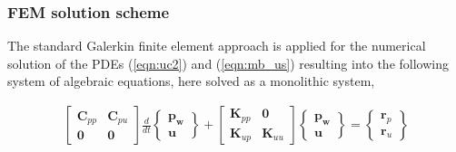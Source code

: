 \subsubsection*{FEM solution scheme}
The standard Galerkin finite element approach is applied for the numerical solution of the PDEs (\ref{eqn:uc2}) and (\ref{eqn:mb_us}) resulting into the following system of algebraic equations, here solved as a monolithic system,

\begin{eqnarray}
\left[
\begin{array}{cc}
\mathbf{C}_{pp} & \mathbf{C}_{pu}
\\
\mathbf{0} & \mathbf{0}
\end{array}
\right]
\frac{d}{dt}
\left\{
\begin{array}{l}
\mathbf{p_w}
\\
\mathbf{u}
\end{array}
\right\}
+
\left[
\begin{array}{ll}
\mathbf{K}_{pp} & \mathbf{0}
\\
\mathbf{K}_{up} & \mathbf{K}_{uu}
\end{array}
\right]
%
\left\{
\begin{array}{l}
\mathbf{p_w}
\\
\mathbf{u}
\end{array}
\right\}
=
\left\{
\begin{array}{l}
\mathbf{r}_p
\\
\mathbf{r}_u
\end{array}
\right\}
\nonumber
\\
\end{eqnarray}



